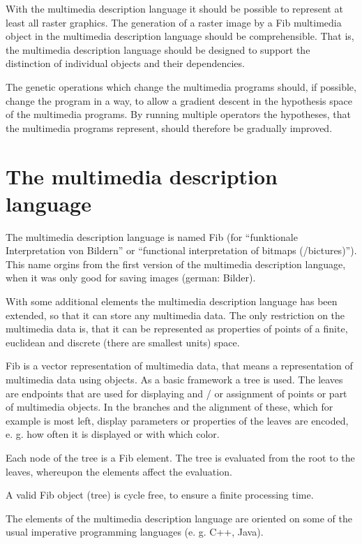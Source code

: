 With the multimedia description language it should be possible to represent at least all raster graphics.
The generation of a raster image by a Fib multimedia object in the multimedia description language should be comprehensible. That is, the multimedia description language should be designed to support the distinction of individual objects and their dependencies.

The genetic operations which change the multimedia programs should, if possible, change the program in a way, to allow a gradient descent in the hypothesis space of the multimedia programs. By running multiple operators the hypotheses, that the multimedia programs represent, should therefore be gradually improved.


\section{The multimedia description language}

The multimedia description language is named Fib (for ``funktionale Interpretation von Bildern'' or ``functional interpretation of bitmaps (/bictures)''). This name orgins from the first version of the multimedia description language, when it was only good for saving images (german: Bilder).

With some additional elements the multimedia description language has been extended, so that it can store any multimedia data. The only restriction on the multimedia data is, that it can be represented as properties of points of a finite, euclidean and discrete (there are smallest units) space.

Fib is a vector representation of multimedia data, that means a representation of multimedia data using objects.
As a basic framework a tree is used. The leaves are endpoints that are used for displaying and / or assignment of points or part of multimedia objects. In the branches and the alignment of these, which for example is most left, display parameters or properties of the leaves are encoded, e. g. how often it is displayed or with which color.

Each node of the tree is a Fib element. The tree is evaluated from the root to the leaves, whereupon the elements affect the evaluation.

A valid Fib object (tree) is cycle free, to ensure a finite processing time.

The elements of the multimedia description language are oriented on some of the usual imperative programming languages (e. g. C++, Java).

